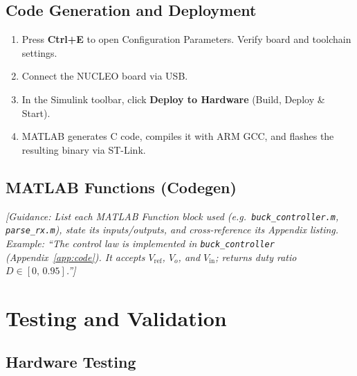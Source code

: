\subsection{Code Generation and Deployment}

\begin{enumerate}
    \item Press \textbf{Ctrl+E} to open Configuration Parameters.
          Verify board and toolchain settings.
    \item Connect the NUCLEO board via USB.
    \item In the Simulink toolbar, click
          \textbf{Deploy to Hardware} (Build, Deploy \& Start).
    \item MATLAB generates C code, compiles it with ARM GCC,
          and flashes the resulting binary via ST-Link.
\end{enumerate}


\subsection{MATLAB Functions (Codegen)}

\textit{[Guidance: List each MATLAB Function block used (e.g.\
\texttt{buck\_controller.m}, \texttt{parse\_rx.m}), state its
inputs/outputs, and cross-reference its Appendix listing. Example:
``The control law is implemented in \texttt{buck\_controller}
(Appendix~\ref{app:code}). It accepts $V_\text{ref}$,
$V_o$, and $V_\text{in}$; returns duty ratio $D \in [0,\,0.95]$.'']}

\section{Testing and Validation}

\subsection{Hardware Testing}

